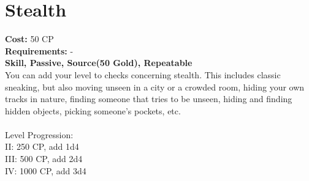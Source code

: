 \section{Stealth}
\textbf{Cost:} 50 CP\\
\textbf{Requirements:} -\\
\textbf{Skill, Passive, Source(50 Gold), Repeatable}\\
You can add your level to checks concerning stealth. This includes classic sneaking, but also moving unseen in a city or a crowded room, hiding your own tracks in nature, finding someone that tries to be unseen, hiding and finding hidden objects, picking someone's pockets, etc.\\
\\
Level Progression:\\
II: 250 CP, add 1d4\\
III: 500 CP, add 2d4\\
IV: 1000 CP, add 3d4\\